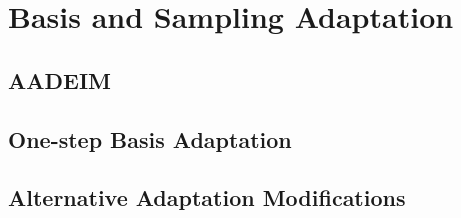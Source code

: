 \section{Basis and Sampling Adaptation}\label{sec:adaptation}

\subsection{AADEIM}

\subsection{One-step Basis Adaptation}

\subsection{Alternative Adaptation Modifications}